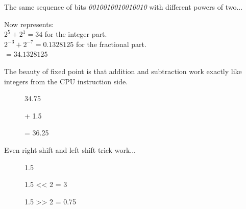 The same sequence of bits \emph{0010010010010010} with different powers of two...
\begin{figure}[H]
 \centering
   
\end{figure} 

Now represents:\\

$ 2^5 + 2^1 = 34 $ for the integer part.\\
$ 2^{-3}+2^{-7} = 0.1328125 $ for the fractional part.\\
$ = 34.1328125$\\

\bigskip

The beauty of fixed point is that addition and subtraction work exactly like integers from the CPU instruction side.\\




\par
\begin{figure}[H]
 \centering
   

   \caption{34.75} 
\end{figure} 

\begin{figure}[H]
 \centering
   
  \caption{+ 1.5} 
\end{figure} 

\begin{figure}[H]
 \centering
   
  {\caption{= 36.25}}
\end{figure} 
\par
 Even right shift and left shift trick work...\\
 
 \par
\begin{figure}[H]
 \centering
   
   \caption{1.5} 
\end{figure} 

\par
\begin{figure}[H]
 \centering
   
   \caption{1.5 << 2  = 3} 
\end{figure}

\par
\begin{figure}[H]
 \centering
   
   \caption{1.5 >> 2 = 0.75} 
\end{figure}

